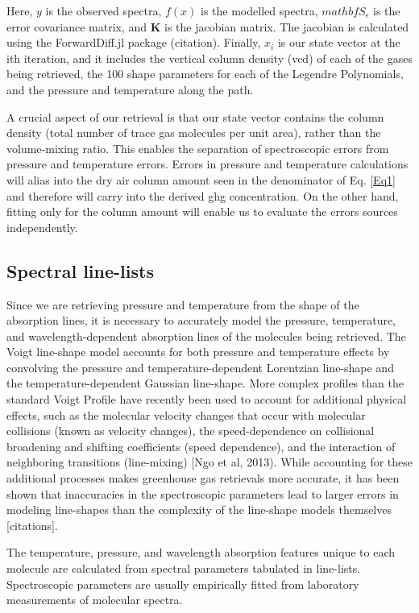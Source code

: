 \documentclass[amt, manuscript]{copernicus}
\begin{document}
Here, $y$ is the observed spectra, $f(x)$ is the modelled spectra, $mathbf{S_{\epsilon}}$ is the error covariance matrix, and $\mathbf{K}$ is the jacobian matrix. The jacobian is calculated using the ForwardDiff.jl package (citation). Finally, $x_i$ is our state vector at the ith iteration, and it includes the vertical column density (vcd) of each of the gases being retrieved, the 100 shape parameters for each of the Legendre Polynomials, and the pressure and temperature along the path. 

A crucial aspect of our retrieval is that our state vector contains the column density (total number of trace gas molecules per unit area), rather than the volume-mixing ratio. This enables the separation of spectroscopic errors from pressure and temperature errors. Errors in pressure and temperature calculations will alias into the dry air column amount seen in the denominator of Eq. \ref{Eq1} and therefore will carry into the derived ghg concentration. On the other hand, fitting only for the column amount will enable us to evaluate the errors sources independently. 



\subsection{Spectral line-lists}
Since we are retrieving pressure and temperature from the shape of the absorption lines, it is necessary to accurately model the pressure, temperature, and wavelength-dependent absorption lines of the molecules being retrieved. The Voigt line-shape model accounts for both pressure and temperature effects by convolving the pressure and temperature-dependent Lorentzian line-shape and the temperature-dependent Gaussian line-shape. More complex profiles than the standard Voigt Profile have recently been used to account for additional physical effects, such as the molecular velocity changes that occur with molecular collisions (known as velocity changes), the speed-dependence on collisional broadening and shifting coefficients (speed dependence), and the interaction of neighboring transitions (line-mixing) [Ngo et al, 2013). While accounting for these additional processes makes greenhouse gas retrievals more accurate, it has been shown that inaccuracies in the spectroscopic parameters lead to larger errors in modeling line-shapes than the complexity of the line-shape models themselves [citations].

The temperature, pressure, and wavelength absorption features unique to each molecule are calculated from spectral parameters tabulated in line-lists. Spectroscopic parameters are usually empirically fitted from laboratory measurements of molecular spectra.
\end{document}
